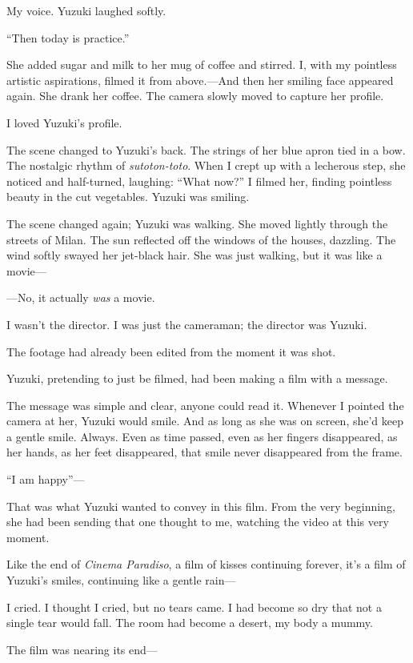 \documentclass[
    a4paper,
    12pt,
    twoside,
    openany,
    UTF8,
    fontset=windows
]{ctexbook}
\begin{document}
My voice. Yuzuki laughed softly.

``Then today is practice.''

She added sugar and milk to her mug of coffee and stirred. I, with my pointless artistic aspirations, filmed it from above.---And then her smiling face appeared again. She drank her coffee. The camera slowly moved to capture her profile.

I loved Yuzuki's profile.

The scene changed to Yuzuki's back. The strings of her blue apron tied in a bow. The nostalgic rhythm of \textit{sutoton-toto}. When I crept up with a lecherous step, she noticed and half-turned, laughing: ``What now?'' I filmed her, finding pointless beauty in the cut vegetables. Yuzuki was smiling.

The scene changed again; Yuzuki was walking. She moved lightly through the streets of Milan. The sun reflected off the windows of the houses, dazzling. The wind softly swayed her jet-black hair. She was just walking, but it was like a movie---

---No, it actually \emph{was} a movie.

I wasn't the director. I was just the cameraman; the director was Yuzuki.

The footage had already been edited from the moment it was shot.

Yuzuki, pretending to just be filmed, had been making a film with a message.

The message was simple and clear, anyone could read it. Whenever I pointed the camera at her, Yuzuki would smile. And as long as she was on screen, she'd keep a gentle smile. Always. Even as time passed, even as her fingers disappeared, as her hands, as her feet disappeared, that smile never disappeared from the frame.

``I am happy''---

That was what Yuzuki wanted to convey in this film. From the very beginning, she had been sending that one thought to me, watching the video at this very moment.

Like the end of \textit{Cinema Paradiso}, a film of kisses continuing forever, it's a film of Yuzuki's smiles, continuing like a gentle rain---

I cried. I thought I cried, but no tears came. I had become so dry that not a single tear would fall. The room had become a desert, my body a mummy.

The film was nearing its end---
\end{document}
